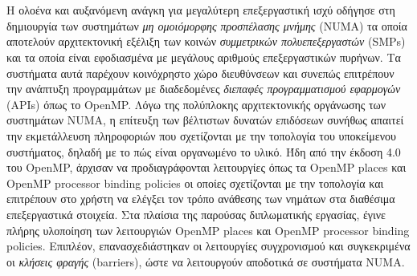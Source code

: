 \chapter*{\abstractname}
\addstarredchapter{\abstractname} %
\makecseabstract


\noindent Η ολοένα και αυξανόμενη ανάγκη για μεγαλύτερη επεξεργαστική ισχύ οδήγησε στη δημιουργία των συστημάτων \textit{μη ομοιόμορφης προσπέλασης μνήμης} (NUMA) τα οποία αποτελούν αρχιτεκτονική εξέλιξη των κοινών \textit{συμμετρικών πολυεπεξεργαστών} (SMPs) και τα οποία είναι εφοδιασμένα με μεγάλους αριθμούς επεξεργαστικών πυρήνων. Τα συστήματα αυτά παρέχουν κοινόχρηστο χώρο διευθύνσεων και συνεπώς επιτρέπουν την ανάπτυξη προγραμμάτων με διαδεδομένες \textit{διεπαφές προγραμματισμού εφαρμογών} (APIs) όπως το OpenMP. Λόγω της πολύπλοκης αρχιτεκτονικής οργάνωσης των συστημάτων NUMA, η επίτευξη των βέλτιστων δυνατών επιδόσεων συνήθως απαιτεί την εκμετάλλευση πληροφοριών που σχετίζονται με την τοπολογία του υποκείμενου συστήματος, δηλαδή με το πώς είναι οργανωμένο το υλικό. Ήδη από την έκδοση 4.0 του OpenMP, άρχισαν να προδιαγράφονται λειτουργίες όπως τα OpenMP places και OpenMP processor binding policies οι οποίες σχετίζονται με την τοπολογία και επιτρέπουν στο χρήστη να ελέγξει τον τρόπο ανάθεσης των νημάτων στα διαθέσιμα επεξεργαστικά στοιχεία. Στα πλαίσια της παρούσας διπλωματικής εργασίας, έγινε πλήρης υλοποίηση των λειτουργιών OpenMP places και OpenMP processor binding policies. Επιπλέον, επανασχεδιάστηκαν οι λειτουργίες συγχρονισμού και συγκεκριμένα οι \textit{κλήσεις φραγής} (barriers), ώστε να λειτουργούν αποδοτικά σε συστήματα NUMA.


\bigskip